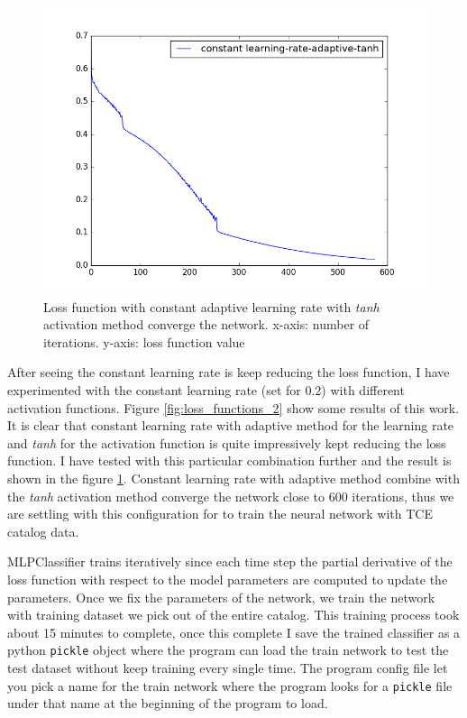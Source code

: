\begin{figure}[!h]
\begin{center}
        \includegraphics[width=0.5\textheight]{img/constant_learning_rate_final.png}
        \caption{Loss function with constant adaptive learning rate with \emph{tanh} activation method converge the network. x-axis: number of iterations. y-axis: loss function value}  \label{fig:loss_functions_3}
\end{center}
\end{figure}

After seeing the constant learning rate is keep reducing the loss function, I have experimented with the constant learning rate  (set for 0.2) with different activation functions. Figure \ref{fig:loss_functions_2} show some results of this work. It is clear that constant learning rate with adaptive method for the learning rate and \emph{tanh} for the activation function is quite impressively kept reducing the loss function. I have tested with this particular combination further and the result is shown in the figure \ref{fig:loss_functions_3}. Constant learning rate with adaptive method combine with the \emph{tanh} activation method converge the network close to 600 iterations, thus we are settling with this configuration for to train the neural network with TCE catalog data. 

MLPClassifier trains iteratively since each time step the partial derivative of the loss function with respect to the model parameters are computed to update the parameters. Once we fix the parameters of the network, we train the network with training dataset we pick out of the entire catalog. This training process took about 15 minutes to complete, once this complete I save the trained classifier as a python \texttt{pickle} object where the program can load the train network to test the test dataset without keep training every single time. The program config file let you pick a name for the train network where the program looks for a \texttt{pickle} file under that name at the beginning of the program to load. 
